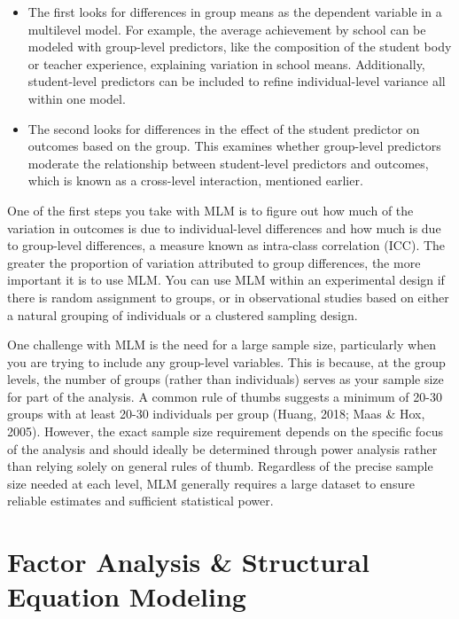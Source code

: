 \documentclass[
  letterpaper,
  DIV=11,
  numbers=noendperiod]{scrreprt}
\begin{document}
\begin{itemize}
\item
  The first looks for differences in group means as the dependent
  variable in a multilevel model. For example, the average achievement
  by school can be modeled with group-level predictors, like the
  composition of the student body or teacher experience, explaining
  variation in school means. Additionally, student-level predictors can
  be included to refine individual-level variance all within one model.
\item
  The second looks for differences in the effect of the student
  predictor on outcomes based on the group. This examines whether
  group-level predictors moderate the relationship between student-level
  predictors and outcomes, which is known as a cross-level interaction,
  mentioned earlier.
\end{itemize}

One of the first steps you take with MLM is to figure out how much of
the variation in outcomes is due to individual-level differences and how
much is due to group-level differences, a measure known as intra-class
correlation (ICC). The greater the proportion of variation attributed to
group differences, the more important it is to use MLM. You can use MLM
within an experimental design if there is random assignment to groups,
or in observational studies based on either a natural grouping of
individuals or a clustered sampling design.

One challenge with MLM is the need for a large sample size, particularly
when you are trying to include any group-level variables. This is
because, at the group levels, the number of groups (rather than
individuals) serves as your sample size for part of the analysis. A
common rule of thumbs suggests a minimum of 20-30 groups with at least
20-30 individuals per group (Huang, 2018; Maas \& Hox, 2005). However,
the exact sample size requirement depends on the specific focus of the
analysis and should ideally be determined through power analysis rather
than relying solely on general rules of thumb. Regardless of the precise
sample size needed at each level, MLM generally requires a large dataset
to ensure reliable estimates and sufficient statistical power.

\section{Factor Analysis \& Structural Equation
Modeling}\label{factor-analysis-structural-equation-modeling}
\end{document}

